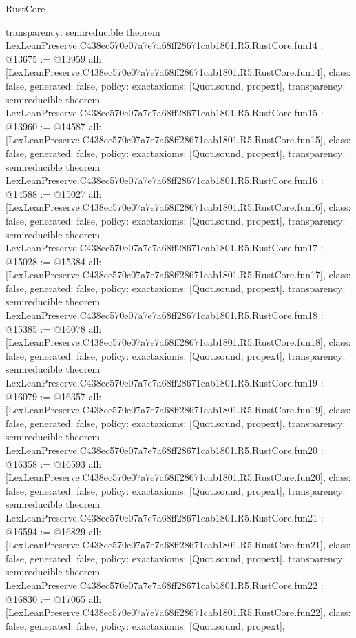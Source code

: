 \begin{lexlean}{RustCore}
\begin{coremodule}
{  transparency: semireducible
}
theorem LexLeanPreserve.C438ec570e07a7e7a68ff28671cab1801.R5.RustCore.fun14 : @13675 := @13959 {
  all: [LexLeanPreserve.C438ec570e07a7e7a68ff28671cab1801.R5.RustCore.fun14],
  class: false,
  generated: false,
  policy: exact{axioms: [Quot.sound, propext]},
  transparency: semireducible
}
theorem LexLeanPreserve.C438ec570e07a7e7a68ff28671cab1801.R5.RustCore.fun15 : @13960 := @14587 {
  all: [LexLeanPreserve.C438ec570e07a7e7a68ff28671cab1801.R5.RustCore.fun15],
  class: false,
  generated: false,
  policy: exact{axioms: [Quot.sound, propext]},
  transparency: semireducible
}
theorem LexLeanPreserve.C438ec570e07a7e7a68ff28671cab1801.R5.RustCore.fun16 : @14588 := @15027 {
  all: [LexLeanPreserve.C438ec570e07a7e7a68ff28671cab1801.R5.RustCore.fun16],
  class: false,
  generated: false,
  policy: exact{axioms: [Quot.sound, propext]},
  transparency: semireducible
}
theorem LexLeanPreserve.C438ec570e07a7e7a68ff28671cab1801.R5.RustCore.fun17 : @15028 := @15384 {
  all: [LexLeanPreserve.C438ec570e07a7e7a68ff28671cab1801.R5.RustCore.fun17],
  class: false,
  generated: false,
  policy: exact{axioms: [Quot.sound, propext]},
  transparency: semireducible
}
theorem LexLeanPreserve.C438ec570e07a7e7a68ff28671cab1801.R5.RustCore.fun18 : @15385 := @16078 {
  all: [LexLeanPreserve.C438ec570e07a7e7a68ff28671cab1801.R5.RustCore.fun18],
  class: false,
  generated: false,
  policy: exact{axioms: [Quot.sound, propext]},
  transparency: semireducible
}
theorem LexLeanPreserve.C438ec570e07a7e7a68ff28671cab1801.R5.RustCore.fun19 : @16079 := @16357 {
  all: [LexLeanPreserve.C438ec570e07a7e7a68ff28671cab1801.R5.RustCore.fun19],
  class: false,
  generated: false,
  policy: exact{axioms: [Quot.sound, propext]},
  transparency: semireducible
}
theorem LexLeanPreserve.C438ec570e07a7e7a68ff28671cab1801.R5.RustCore.fun20 : @16358 := @16593 {
  all: [LexLeanPreserve.C438ec570e07a7e7a68ff28671cab1801.R5.RustCore.fun20],
  class: false,
  generated: false,
  policy: exact{axioms: [Quot.sound, propext]},
  transparency: semireducible
}
theorem LexLeanPreserve.C438ec570e07a7e7a68ff28671cab1801.R5.RustCore.fun21 : @16594 := @16829 {
  all: [LexLeanPreserve.C438ec570e07a7e7a68ff28671cab1801.R5.RustCore.fun21],
  class: false,
  generated: false,
  policy: exact{axioms: [Quot.sound, propext]},
  transparency: semireducible
}
theorem LexLeanPreserve.C438ec570e07a7e7a68ff28671cab1801.R5.RustCore.fun22 : @16830 := @17065 {
  all: [LexLeanPreserve.C438ec570e07a7e7a68ff28671cab1801.R5.RustCore.fun22],
  class: false,
  generated: false,
  policy: exact{axioms: [Quot.sound, propext]},
}
\end{coremodule}
\end{lexlean}
